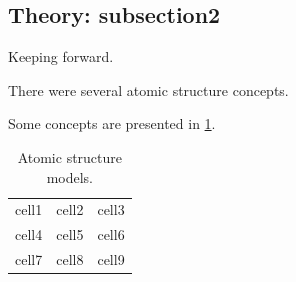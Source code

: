 \subsection{Theory: subsection2}
\label{subsection:subsection2}

\begin{noteblock}
    Keeping forward.
\end{noteblock}

There were several atomic structure concepts.

Some concepts are presented in \cref{table:concepts}.
\begin{table}[!hbt]
    \begin{tabular}{ |c|c|c| }
        \hline
        cell1 & cell2 & cell3 \\
        cell4 & cell5 & cell6 \\
        cell7 & cell8 & cell9 \\
        \hline
    \end{tabular}
    \caption{Atomic structure models.}
    \label{table:concepts}
\end{table}

\glsresetall                                     %
